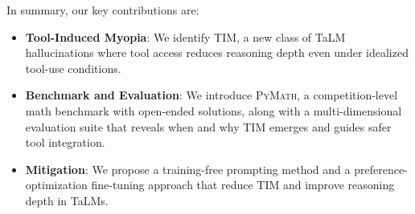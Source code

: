 \documentclass[11pt]{article}
\def \dataset{\textsc{PyMath}\xspace}
\def \task{\textsc{TIM}\xspace}
\newcommand{\farima}[1]{{\color{orange}Farima: #1}}
\begin{document}
% 
% 
In summary, our key contributions are:
\begin{itemize}
\item \textbf{Tool-Induced Myopia}: We identify \task, a new class of TaLM hallucinations where tool access reduces reasoning depth even under idealized tool-use conditions.
\item \textbf{Benchmark and Evaluation}: We introduce \dataset{}, a competition-level math benchmark with open-ended solutions, along with a multi-dimensional evaluation suite that reveals when and why \task{} emerges and guides safer tool integration.
\item \textbf{Mitigation}: We propose a training-free prompting method and a preference-optimization fine-tuning approach that reduce \task and improve reasoning depth in TaLMs.
\end{itemize}
\end{document}
